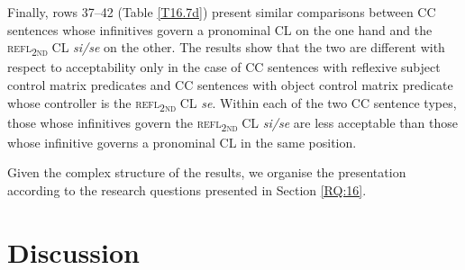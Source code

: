 Finally, rows 37--42 (Table \ref{T16.7d}) present similar comparisons between CC sentences whose infinitives govern a pronominal CL on the one hand and the \textsc{refl\textsubscript{2nd}} CL \textit{si/se} on the other. The results show that the two are different with respect to acceptability only in the case of CC sentences with reflexive subject control matrix predicates and CC sentences with object control matrix predicate whose controller is the \textsc{refl\textsubscript{2nd}} CL \textit{se}. Within each of the two CC sentence types, those whose infinitives govern the \textsc{refl\textsubscript{2nd}} CL \textit{si/se} are less acceptable than those whose infinitive governs a pronominal CL in the same position.


Given the complex structure of the results, we organise the presentation according to the research questions presented in Section \ref{RQ:16}.





\section{Discussion}
\label{Discussion:16}
